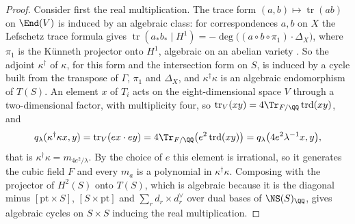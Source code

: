 \begin{proof}
Consider first the real multiplication. The trace form
$(a,b)\mapsto\operatorname{tr}(ab)$ on $\End(V)$ is induced by an algebraic
class: for correspondences $a,b$ on $X$
the Lefschetz trace formula gives
$\operatorname{tr}(a_{*}b_{*}\mid H^{1})=-\deg\bigl((a\circ b\circ\pi_{1})\cdot\Delta_{X}\bigr)$,
where $\pi_{1}$ is the K\"unneth projector onto $H^{1}$, algebraic on an
abelian variety \cite[\S2]{Kle68}. So the adjoint $\kappa^{\dagger}$ of
$\kappa$, for this form and the intersection form on $S$, is induced by a
cycle built from the transpose of $\Gamma$, $\pi_{1}$ and $\Delta_{X}$, and
$\kappa^{\dagger}\kappa$ is an algebraic endomorphism of $T(S)$. An element
$x$ of $T_{i}$ acts on the eight-dimensional space $V$ through a
two-dimensional factor, with multiplicity four, so
$\operatorname{tr}_{V}(xy)=4\Tr_{F/\QQ}\operatorname{trd}(xy)$, and
\[
  q_{\lambda}(\kappa^{\dagger}\kappa x,y)
  =\operatorname{tr}_{V}(ex\cdot ey)
  =4\Tr_{F/\QQ}\bigl(e^{2}\operatorname{trd}(xy)\bigr)
  =q_{\lambda}\bigl(4e^{2}\lambda^{-1}x,y\bigr),
\]
that is $\kappa^{\dagger}\kappa=m_{4e^{2}/\lambda}$. By the choice of $e$ this
element is irrational, so it generates the cubic field $F$ and every $m_{a}$
is a polynomial in $\kappa^{\dagger}\kappa$. Composing with the projector of
$H^{2}(S)$ onto $T(S)$, which is algebraic because it is the diagonal minus
$[\mathrm{pt}\times S]$, $[S\times\mathrm{pt}]$ and $\sum_{r}d_{r}\times d_{r}^{\vee}$
over dual bases of $\NS(S)_{\QQ}$, gives algebraic cycles on $S\times S$
inducing the real multiplication.


\end{proof}
